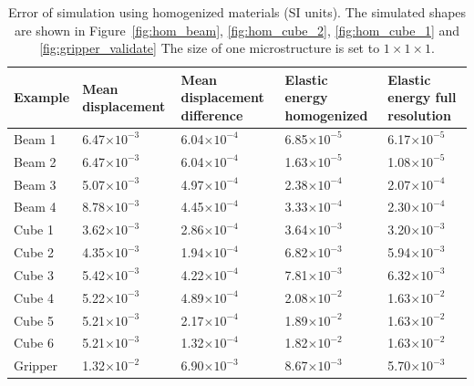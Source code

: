 \begin{table}
	\centering
	\footnotesize
	\caption{Error of simulation using homogenized materials (SI units). 
	The simulated shapes are shown in Figure~\ref{fig:hom_beam},
	\ref{fig:hom_cube_2}, \ref{fig:hom_cube_1} and \ref{fig:gripper_validate}
	The size of one microstructure is set to $1\times1\times1$.}
	{\begin{tabularx}{\linewidth}{ |X| X | X | X | X | }
			\hline
			Example & Mean displacement & Mean displacement difference & Elastic energy \newline homogenized & Elastic energy \newline full resolution\\ \hline
			Beam 1 & 6.47$\times10^{-3}$ & 6.04$\times10^{-4}$ & 6.85$\times10^{-5}$ & 6.17$\times10^{-5}$ \\
			Beam 2 & 6.47$\times10^{-3}$ & 6.04$\times10^{-4}$ & 1.63$\times10^{-5}$ & 1.08$\times10^{-5}$ \\
			Beam 3 & 5.07$\times10^{-3}$ & 4.97$\times10^{-4}$ & 2.38$\times10^{-4}$ & 2.07$\times10^{-4}$ \\
			Beam 4 & 8.78$\times10^{-3}$ & 4.45$\times10^{-4}$ & 3.33$\times10^{-4}$ & 2.30$\times10^{-4}$ \\
			Cube 1 & 3.62$\times10^{-3}$ & 2.86$\times10^{-4}$ & 3.64$\times10^{-3}$ & 3.20$\times10^{-3}$ \\
			Cube 2 & 4.35$\times10^{-3}$ & 1.94$\times10^{-4}$ & 6.82$\times10^{-3}$ & 5.94$\times10^{-3}$ \\
			Cube 3 & 5.42$\times10^{-3}$ & 4.22$\times10^{-4}$ & 7.81$\times10^{-3}$ & 6.32$\times10^{-3}$ \\
			Cube 4 & 5.22$\times10^{-3}$ & 4.89$\times10^{-4}$ & 2.08$\times10^{-2}$ & 1.63$\times10^{-2}$ \\
			Cube 5 & 5.21$\times10^{-3}$ & 2.17$\times10^{-4}$ & 1.89$\times10^{-2}$ & 1.63$\times10^{-2}$ \\
			Cube 6 & 5.21$\times10^{-3}$ & 1.32$\times10^{-4}$ & 1.82$\times10^{-2}$ & 1.63$\times10^{-2}$ \\
			Gripper& 1.32$\times10^{-2}$ & 6.90$\times10^{-3}$ & 8.67$\times10^{-3}$ & 5.70$\times10^{-3}$ \\
			\hline
	\end{tabularx} }
	\label{tab:hom}
\end{table}
